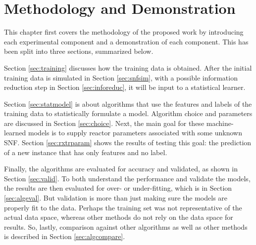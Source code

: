 \chapter{Methodology and Demonstration}
\label{ch:demo_method}

This chapter first covers the methodology of the proposed work by introducing
each experimental component and a demonstration of each component. This has been 
split into three sections, summarized below.

Section \ref{sec:training} discusses how the training data is obtained.  After
the initial training data is simulated in Section \ref{sec:snfsim}, with a
possible information reduction step in Section \ref{sec:inforeduc}, it will be
input to a statistical learner. 

Section \ref{sec:statmodel} is about algorithms that use the features and
labels of the training data to statistically formulate a model. Algorithm
choice and parameters are discussed in Section \ref{sec:choice}.  Next, the
main goal for these machine-learned models is to supply reactor parameters
associated with some unknown \gls{SNF}. Section \ref{sec:rxtrparam} shows the
results of testing this goal: the prediction of a new instance that has only
features and no label.  

Finally, the algorithms are evaluated for accuracy and validated, as shown
in Section \ref{sec:valid}.  To both understand the performance and validate
the models, the results are then evaluated for over- or under-fitting, which is
in Section \ref{sec:algeval}.  But validation is more than just making sure the
models are properly fit to the data.  Perhaps the training set was not
representative of the actual data space, whereas other methods do not rely on
the data space for results. So, lastly, comparison against other algorithms as
well as other methods is described in Section \ref{sec:algcompare}.

